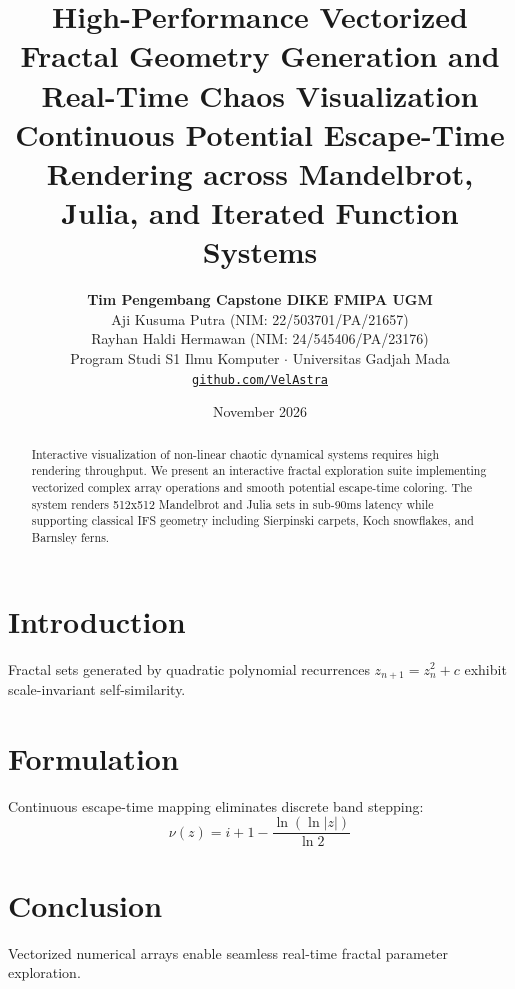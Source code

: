 \documentclass[11pt,a4paper]{article}
\title{\textbf{\LARGE High-Performance Vectorized Fractal Geometry Generation and Real-Time Chaos Visualization}\\[0.4em]
\large Continuous Potential Escape-Time Rendering across Mandelbrot, Julia, and Iterated Function Systems}
\author{\textbf{Tim Pengembang Capstone DIKE FMIPA UGM}\\[0.2em]
Aji Kusuma Putra (NIM: 22/503701/PA/21657)\\[0.1em]
Rayhan Haldi Hermawan (NIM: 24/545406/PA/23176)\\[0.2em]
Program Studi S1 Ilmu Komputer $\cdot$ Universitas Gadjah Mada\\[0.2em]
\texttt{\href{https://github.com/VelAstra}{github.com/VelAstra}}}
\date{November 2026}
\begin{document}
\maketitle

\begin{abstract}
Interactive visualization of non-linear chaotic dynamical systems requires high rendering throughput. We present an interactive fractal exploration suite implementing vectorized complex array operations and smooth potential escape-time coloring. The system renders 512x512 Mandelbrot and Julia sets in sub-90ms latency while supporting classical IFS geometry including Sierpinski carpets, Koch snowflakes, and Barnsley ferns.
\end{abstract}

\section{Introduction}
Fractal sets generated by quadratic polynomial recurrences $z_{n+1} = z_n^2 + c$ exhibit scale-invariant self-similarity.

\section{Formulation}
Continuous escape-time mapping eliminates discrete band stepping:
\begin{equation}
    \nu(z) = i + 1 - \frac{\ln(\ln |z|)}{\ln 2}
\end{equation}

\section{Conclusion}
Vectorized numerical arrays enable seamless real-time fractal parameter exploration.
\end{document}
